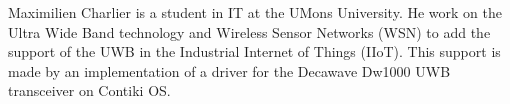 Maximilien Charlier is a student in IT at the UMons University. 
He work on the Ultra Wide Band technology and Wireless Sensor Networks (WSN) to add the support of the UWB in the Industrial Internet of Things (IIoT). 
This support is made by an implementation of a driver for the Decawave Dw1000 UWB transceiver on Contiki OS.